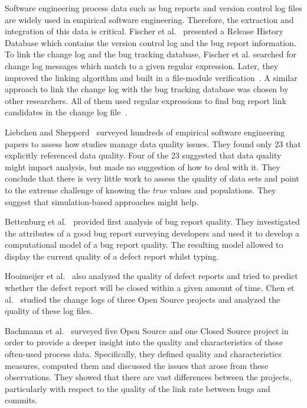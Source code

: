 \documentclass{llncs}
\begin{document}
Software engineering process data such as bug reports and
version control log files are widely used in empirical software
engineering. Therefore, the extraction and integration of this data is critical.
Fischer et al.~\cite{con0} presented a Release History Database which contains 
the version control log and the bug report information. To link the change log and 
the bug tracking database, Fischer et al. searched for change log messages which 
match to a given regular expression. Later, they improved the linking algorithm and 
built in a file-module verification~\cite{con9}. A similar approach to link the 
change log with the bug tracking database was chosen by other researchers. All of 
them used regular expressions to find bug report link candidates in the change log 
file~\cite{con10,con6,con11,con12,con13}.

Liebchen and Shepperd~\cite{con14} surveyed hundreds of empirical software engineering 
papers to assess how studies manage data quality issues. They found only 23 that 
explicitly referenced data quality. Four of the 23 suggested that data quality 
might impact analysis, but made no suggestion of how to deal with it. They conclude that 
there is very little work to assess the quality of data sets and point to the extreme 
challenge of knowing the \textit{true} values and populations. They suggest that 
simulation-based approaches might help.

Bettenburg et al.~\cite{con15,con16,con17} provided first analysis of bug report quality. 
They investigated the attributes of a good bug report surveying developers and used it to 
develop a computational model of a bug report quality. The resulting model allowed to 
display the current quality of a defect report whilst typing.

Hooimeijer et al.~\cite{con18} also analyzed the quality of defect reports and tried to 
predict whether the defect report will be closed within a given amount of time.
Chen et al.~\cite{con19} studied the change logs of three Open Source projects and analyzed 
the quality of these log files. 

Bachmann et al.~\cite{con20} surveyed five Open Source and one Closed Source project 
in order to provide a deeper insight into the quality and characteristics of these 
often-used process data. Specifically, they defined quality and characteristics measures, 
computed them and discussed the issues that arose from these observations. 
They showed that there are vast differences between the projects, particularly with respect 
to the quality of the link rate between bugs and commits.
\end{document}
